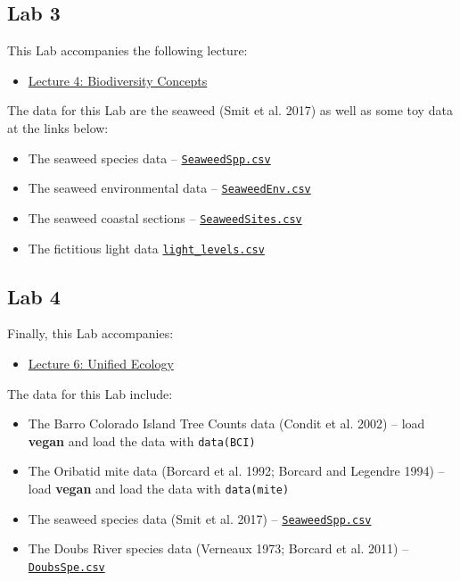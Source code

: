 \documentclass[
  10pt,
]{book}
\providecommand{\tightlist}{%
  \setlength{\itemsep}{0pt}\setlength{\parskip}{0pt}}
\let\oldtexttt\texttt
\renewcommand{\texttt}[1]{\oldtexttt{\small #1}}
\begin{document}
\subsection{Lab 3}\label{lab-3}

This Lab accompanies the following lecture:

\begin{itemize}
\tightlist
\item
  \href{Lec-04-biodiversity.qmd}{Lecture 4: Biodiversity Concepts}
\end{itemize}

The data for this Lab are the seaweed (Smit et al. 2017) as well as some
toy data at the links below:

\begin{itemize}
\tightlist
\item
  The seaweed species data --
  \href{../data/seaweed/SeaweedSpp.csv}{\texttt{SeaweedSpp.csv}}
\item
  The seaweed environmental data --
  \href{../data/seaweed/SeaweedEnv.csv}{\texttt{SeaweedEnv.csv}}
\item
  The seaweed coastal sections --
  \href{../data/seaweed/SeaweedSites.csv}{\texttt{SeaweedSites.csv}}
\item
  The fictitious light data
  \href{../data/light_levels.csv}{\texttt{light\_levels.csv}}
\end{itemize}

\subsection{Lab 4}\label{lab-4}

Finally, this Lab accompanies:

\begin{itemize}
\tightlist
\item
  \href{Lec-06-unified-ecology.qmd}{Lecture 6: Unified Ecology}
\end{itemize}

The data for this Lab include:

\begin{itemize}
\tightlist
\item
  The Barro Colorado Island Tree Counts data (Condit et al. 2002) --
  load \textbf{vegan} and load the data with \texttt{data(BCI)}
\item
  The Oribatid mite data (Borcard et al. 1992; Borcard and Legendre
  1994) -- load \textbf{vegan} and load the data with
  \texttt{data(mite)}
\item
  The seaweed species data (Smit et al. 2017) --
  \href{../data/seaweed/SeaweedSpp.csv}{\texttt{SeaweedSpp.csv}}
\item
  The Doubs River species data (Verneaux 1973; Borcard et al. 2011) --
  \href{../data/DoubsSpe.csv}{\texttt{DoubsSpe.csv}}
\end{itemize}
\end{document}
